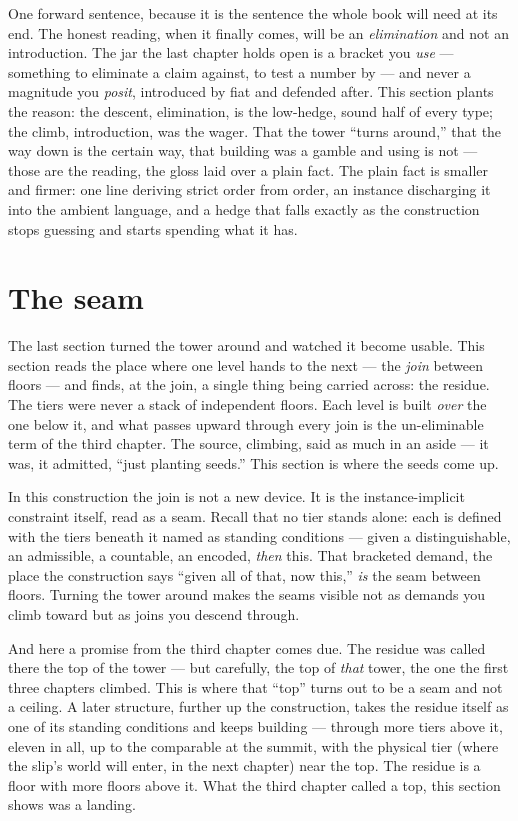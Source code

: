 One forward sentence, because it is the sentence the whole book will need at its end. The honest reading, when it
finally comes, will be an \emph{elimination} and not an introduction. The jar the last chapter holds open is a bracket
you \emph{use} --- something to eliminate a claim against, to test a number by --- and never a magnitude you
\emph{posit}, introduced by fiat and defended after. This section plants the reason: the descent, elimination, is the
low-hedge, sound half of every type; the climb, introduction, was the wager. That the tower ``turns around,'' that the
way down is the certain way, that building was a gamble and using is not --- those are the reading, the gloss laid over
a plain fact. The plain fact is smaller and firmer: one line deriving strict order from order, an instance discharging
it into the ambient language, and a hedge that falls exactly as the construction stops guessing and starts spending
what it has.

\section{The seam}

The last section turned the tower around and watched it become usable. This section reads the place where one level
hands to the next --- the \emph{join} between floors --- and finds, at the join, a single thing being carried across:
the residue. The tiers were never a stack of independent floors. Each level is built \emph{over} the one below it, and
what passes upward through every join is the un-eliminable term of the third chapter. The source, climbing, said as
much in an aside --- it was, it admitted, ``just planting seeds.'' This section is where the seeds come up.

In this construction the join is not a new device. It is the instance-implicit constraint itself, read as a seam.
Recall that no tier stands alone: each is defined with the tiers beneath it named as standing conditions --- given a
distinguishable, an admissible, a countable, an encoded, \emph{then} this. That bracketed demand, the place the
construction says ``given all of that, now this,'' \emph{is} the seam between floors. Turning the tower around makes
the seams visible not as demands you climb toward but as joins you descend through.

And here a promise from the third chapter comes due. The residue was called there the top of the tower --- but
carefully, the top of \emph{that} tower, the one the first three chapters climbed. This is where that ``top'' turns out
to be a seam and not a ceiling. A later structure, further up the construction, takes the residue itself as one of its
standing conditions and keeps building --- through more tiers above it, eleven in all, up to the comparable at the
summit, with the physical tier (where the slip's world will enter, in the next chapter) near the top. The residue is a
floor with more floors above it. What the third chapter called a top, this section shows was a landing.

